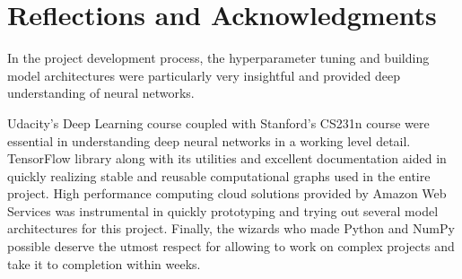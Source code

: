 \documentclass{article}
\begin{document}
	\section{Reflections and Acknowledgments}	
	In the project development process, the hyperparameter tuning and building model architectures were particularly very insightful and provided deep understanding of neural networks.
	
	Udacity's Deep Learning course coupled with Stanford's CS231n course \cite{cs231n} were essential in understanding deep neural networks in a working level detail. TensorFlow library along with its utilities and excellent documentation \cite{tensorflow-doc} aided in quickly realizing stable and reusable computational graphs used in the entire project. High performance computing cloud solutions provided by Amazon Web Services was instrumental in quickly prototyping and trying out several model architectures for this project. Finally, the wizards who made Python and NumPy possible deserve the utmost respect for allowing to work on complex projects and take it to completion within weeks.
	
	
	
\end{document}
